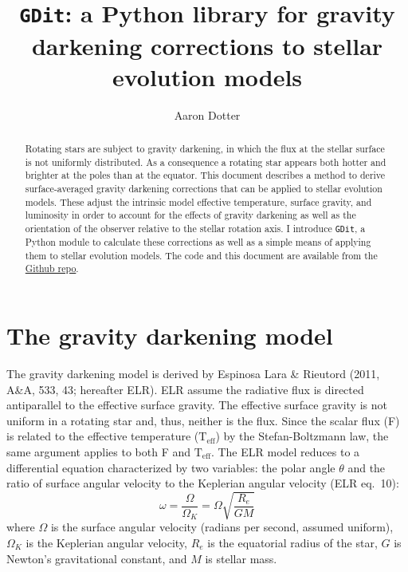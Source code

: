 \documentclass[12pt]{article}
\newcommand{\Teff}{\mathrm{T_{eff}}}
\begin{document}
\title{\texttt{GDit}: a Python library for gravity darkening corrections to stellar evolution models}
\author{Aaron Dotter}

\maketitle

\begin{abstract}
Rotating stars are subject to gravity darkening, in which the flux
at the stellar surface is not uniformly distributed. As a consequence
a rotating star appears both hotter and brighter at the poles than
at the equator. This document describes a method to derive surface-averaged
gravity darkening corrections that can be applied to stellar evolution models.
These adjust the intrinsic model effective temperature, surface gravity, and
luminosity in order to account for the effects of gravity darkening as well as
the orientation of the observer relative to the stellar rotation axis. I introduce
\texttt{GDit}, a Python module to calculate these corrections as well as a
simple means of applying them to stellar evolution models. The code and this document
are available from the \href{https://github.com/aarondotter/GDit}{Github repo}.
\end{abstract}


\section{The gravity darkening model}
The gravity darkening model is derived by Espinosa Lara \& Rieutord (2011,
A\&A, 533, 43; hereafter ELR). ELR assume the radiative flux is directed
antiparallel to the effective surface gravity. The effective surface gravity
is not uniform in a rotating star and, thus, neither is the flux. Since the
scalar flux (F) is related to the effective temperature ($\Teff$) by the
Stefan-Boltzmann law, the same
argument applies to both F and $\Teff$. The ELR model reduces to a differential
equation characterized by two variables: the polar angle $\theta$ and the ratio
of surface angular velocity to the Keplerian angular velocity (ELR eq.\ 10):
\begin{equation}
  \omega = \frac{\Omega}{\Omega_K} = \Omega \sqrt{ \frac{R_e}{GM} }
\end{equation}
where $\Omega$ is the surface angular velocity (radians per second,
assumed uniform), $\Omega_K$ is the Keplerian angular velocity,
$R_e$ is the equatorial radius of the star, $G$ is Newton's gravitational constant,
and $M$ is stellar mass. 
\end{document}
